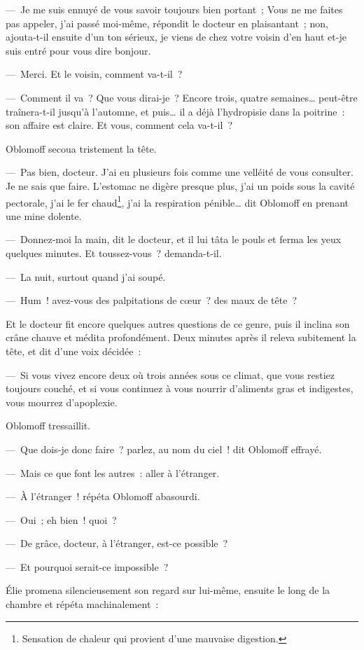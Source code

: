 \documentclass[french,twoside]{book} %
\begin{document}
— Je me suis ennuyé de vous savoir toujours bien portant ; Vous ne me faites pas appeler, j’ai passé moi-même, répondit le docteur en plaisantant ; non, ajouta-t-il ensuite d’un ton sérieux, je viens de chez votre voisin d’en haut et-je suis entré pour vous dire bonjour.\par
— Merci. Et le voisin, comment va-t-il ?\par
— Comment il va ? Que vous dirai-je ? Encore trois, quatre semaines… peut-être traînera-t-il jusqu’à l’automne, et puis… il a déjà l’hydropisie dans la poitrine : son affaire est claire. Et vous, comment cela va-t-il ?\par
Oblomoff secoua tristement la tête.\par
— Pas bien, docteur. J’ai eu plusieurs fois comme une velléité de vous consulter. Je ne sais que faire. L’estomac ne digère presque plus, j’ai un poids sous la cavité pectorale, j’ai le fer chaud\footnote{Sensation de chaleur qui provient d’une mauvaise digestion.}, j’ai la respiration pénible… dit Oblomoff en prenant une mine dolente.\par
— Donnez-moi la main, dit le docteur, et il lui tâta le pouls et ferma les yeux quelques minutes. Et toussez-vous ? demanda-t-il.\par
— La nuit, surtout quand j’ai soupé.\par
— Hum ! avez-vous des palpitations de cœur ? des maux de tête ?\par
Et le docteur fit encore quelques autres questions de ce genre, puis il inclina son crâne chauve et médita profondément. Deux minutes après il releva subitement la tête, et dit d’une voix décidée :\par
— Si vous vivez encore deux où trois années sous ce climat, que vous restiez toujours couché, et si vous continuez à vous nourrir d’aliments gras et indigestes, vous mourrez d’apoplexie.\par
Oblomoff tressaillit.\par
— Que dois-je donc faire ? parlez, au nom du ciel ! dit Oblomoff effrayé.\par
— Mais ce que font les autres : aller à l’étranger.\par
— À l’étranger ! répéta Oblomoff abasourdi.\par
— Oui ; eh bien ! quoi ?\par
— De grâce, docteur, à l’étranger, est-ce possible ?\par
— Et pourquoi serait-ce impossible ?\par
Élie promena silencieusement son regard sur lui-même, ensuite le long de la chambre et répéta machinalement :\par
\end{document}
